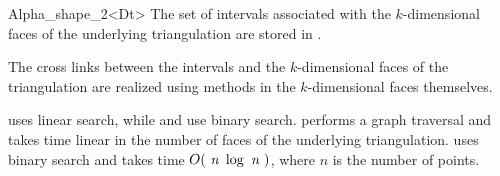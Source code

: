 \begin{ccRefClass} {Alpha_shape_2<Dt>}
\ccImplementation
The set of intervals associated with the
$k$-dimensional faces of the underlying triangulation are
stored in .

The cross links between the intervals and the $k$-dimensional faces of the
triangulation are realized using methods in the $k$-dimensional faces
themselves.

 uses linear search, while 
 and  
use binary search.
 performs a graph traversal and takes time
linear in the number of faces of the underlying triangulation.
 uses binary search and takes time
$O(\mbox{ \em n } \log{\mbox{ \em n } })$, where  $n$ is the number of points.

\end{ccRefClass}

